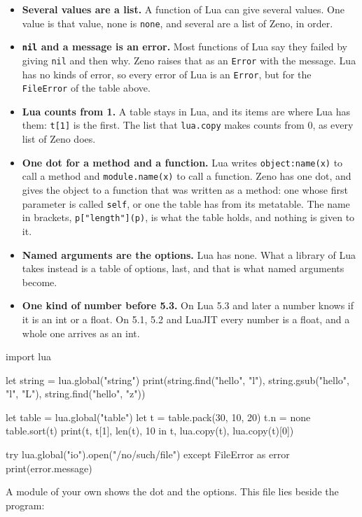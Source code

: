 \begin{itemize}
\item \textbf{Several values are a list.} A function of Lua can give
  several values. One value is that value, none is \verb|none|, and
  several are a list of Zeno, in order.
\item \textbf{\texttt{nil} and a message is an error.} Most functions
  of Lua say they failed by giving \verb|nil| and then why. Zeno
  raises that as an \verb|Error| with the message. Lua has no kinds of
  error, so every error of Lua is an \verb|Error|, but for the
  \verb|FileError| of the table above.
\item \textbf{Lua counts from 1.} A table stays in Lua, and its items
  are where Lua has them: \verb|t[1]| is the first. The list that
  \verb|lua.copy| makes counts from 0, as every list of Zeno does.
\item \textbf{One dot for a method and a function.} Lua writes
  \verb|object:name(x)| to call a method and \verb|module.name(x)| to
  call a function. Zeno has one dot, and gives the object to a function
  that was written as a method: one whose first parameter is called
  \verb|self|, or one the table has from its metatable. The name in
  brackets, \verb|p["length"](p)|, is what the table holds, and
  nothing is given to it.
\item \textbf{Named arguments are the options.} Lua has none. What a
  library of Lua takes instead is a table of options, last, and that
  is what named arguments become.
\item \textbf{One kind of number before 5.3.} On Lua 5.3 and later a
  number knows if it is an int or a float. On 5.1, 5.2 and LuaJIT
  every number is a float, and a whole one arrives as an int.
\end{itemize}

\begin{zeno}[file=values.zeno, dir=lua]
import lua

let string = lua.global("string")
print(string.find("hello", "l"), string.gsub("hello", "l", "L"), string.find("hello", "z"))

let table = lua.global("table")
let t = table.pack(30, 10, 20)
t.n = none
table.sort(t)
print(t, t[1], len(t), 10 in t, lua.copy(t), lua.copy(t)[0])

try {
    lua.global("io").open("/no/such/file")
} except FileError as error {
    print(error.message)
}
\end{zeno}

A module of your own shows the dot and the options. This file lies
beside the program:


